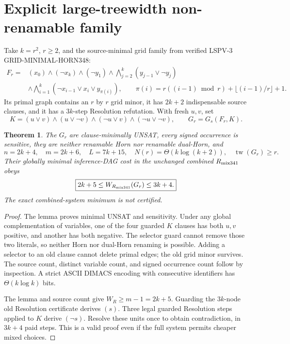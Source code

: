 \documentclass[11pt]{article}
\newtheorem{theorem}{Theorem}
\begin{document}
\section*{Explicit large-treewidth non-renamable family}
Take $k=r^2$, $r\ge2$, and the source-minimal grid family from verified LSPV-3 GRID-MINIMAL-HORN348:
\[
\begin{split}
F_r={}&(x_0)\wedge(\neg x_k)\wedge(\neg y_1)
\wedge\bigwedge_{j=2}^k (y_{j-1}\vee\neg y_j)\\
&\wedge\bigwedge_{i=1}^k(\neg x_{i-1}\vee x_i\vee y_{\pi(i)}),
\qquad
\pi(i)=r((i-1)\bmod r)+\lfloor (i-1)/r\rfloor+1.
\end{split}
\]
Its primal graph contains an $r$ by $r$ grid minor, it has $2k+2$ indispensable source clauses, and it has a $3k$-step Resolution refutation. With fresh $u,v$, set
\[
K=(u\vee v)\wedge(u\vee\neg v)\wedge(\neg u\vee v)\wedge(\neg u\vee\neg v),
\qquad G_r=G_s(F_r,K).
\]
\begin{theorem}
The $G_r$ are clause-minimally UNSAT, every signed occurrence is sensitive, they are neither renamable Horn nor renamable dual-Horn, and
\[
n=2k+4,\quad m=2k+6,\quad L=7k+15,\quad
N(r)=\Theta(k\log(k+2)),\quad
\operatorname{tw}(G_r)\ge r.
\]
Their globally minimal inference-DAG cost in the unchanged combined $R_{\rm mix341}$ obeys
\[
\boxed{2k+5\le W_{R_{\rm mix341}}(G_r)\le3k+4.}
\]
The exact combined-system minimum is not certified.
\end{theorem}
\begin{proof}
The lemma proves minimal UNSAT and sensitivity. Under any global complementation of variables, one of the four guarded $K$ clauses has both $u,v$ positive, and another has both negative. The selector guard cannot remove those two literals, so neither Horn nor dual-Horn renaming is possible. Adding a selector to an old clause cannot delete primal edges; the old grid minor survives. The source count, distinct variable count, and signed occurrence count follow by inspection. A strict ASCII DIMACS encoding with consecutive identifiers has $\Theta(k\log k)$ bits.

The lemma and source count give $W_R\ge m-1=2k+5$. Guarding the $3k$-node old Resolution certificate derives $(s)$. Three legal guarded Resolution steps applied to $K$ derive $(\neg s)$. Resolve these units once to obtain contradiction, in $3k+4$ paid steps. This is a valid proof even if the full system permits cheaper mixed choices.
\end{proof}
\end{document}
